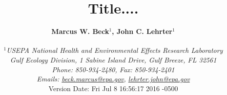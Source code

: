 \documentclass[letterpaper,12pt,oneside]{article}\usepackage[]{graphicx}\usepackage[]{color}
\begin{document}
\raggedbottom
\linenumbers
\raggedright
{}
\setlength{\parindent}{0.5in}
\renewcommand\refname{References \vspace{12pt}}

\begin{singlespace}
\title{{\bf {\Large Title....}}}
\author{
  {\bf {\normalsize Marcus W. Beck$^1$, John C. Lehrter$^1$}}
  \\\\{\textit {\normalsize $^1$USEPA National Health and Environmental Effects Research Laboratory}}
  \\{\textit {\normalsize Gulf Ecology Division, 1 Sabine Island Drive, Gulf Breeze, FL 32561}}
	\\{\textit {\normalsize Phone: 850-934-2480, Fax: 850-934-2401}}
	\\{\textit {\normalsize Emails: \href{mailto:beck.marcus@epa.gov}{beck.marcus@epa.gov}, \href{mailto:lehrter.john@epa.gov}{lehrter.john@epa.gov}}}
  \vspace{1in} 
  \\ Version Date:   Fri Jul 8 16:56:17 2016 -0500
	}
\date{}
\maketitle
\end{singlespace}
\clearpage
\end{document}
